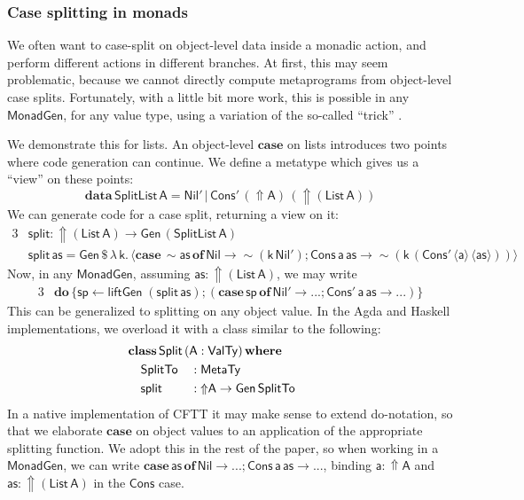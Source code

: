 \documentclass[acmsmall]{acmart}
\newcommand{\mit}[1]{{\mathsf{#1}}}
\newcommand{\msf}[1]{{\mathsf{#1}}}
\newcommand{\mbf}[1]{{\mathbf{#1}}}
\newcommand{\bs}[1]{\boldsymbol{#1}}
\newcommand{\mdo}{\mbf{do}\,}
\newcommand{\ind}{\hspace{1em}}
\newcommand{\lam}{\lambda\,}
\newcommand{\data}{\mbf{data}\,}
\newcommand{\where}{\mbf{where}}
\newcommand{\of}{\mbf{of}\,}
\newcommand{\vas}{\mathsf{as}}
\newcommand{\vk}{\mathsf{k}}
\newcommand{\vA}{\mathsf{A}}
\newcommand{\va}{\mathsf{a}}
\newcommand{\List}{\msf{List}}
\newcommand{\Nil}{\msf{Nil}}
\newcommand{\Cons}{\msf{Cons}}
\newcommand{\fro}{\leftarrow}
\newcommand{\case}{\mbf{case\,}}
\newcommand{\Lift}{{\Uparrow}}
\newcommand{\Up}{{\Uparrow}}
\newcommand{\spl}{{\bs{\sim}}}
\newcommand{\ql}{{\bs{\langle}}}
\newcommand{\qr}{{\bs{\rangle}}}
\newcommand{\MTy}{\msf{MetaTy}}
\newcommand{\VTy}{\msf{ValTy}}
\theoremstyle{remark}
\newcommand{\tyclass}{\mbf{class}}
\newcommand{\Gen}{\msf{Gen}}
\newcommand{\qt}[1]{\ql#1\qr}
\newcommand{\liftGen}{\mit{liftGen}}
\newcommand{\MonadGen}{\msf{MonadGen}}
\newcommand{\dlr}{\,\$\,}
\begin{document}
\subsubsection{Case splitting in monads}
We often want to case-split on object-level data inside a monadic action, and
perform different actions in different branches. At first, this may seem
problematic, because we cannot directly compute metaprograms from object-level
case splits. Fortunately, with a little bit more work, this is possible in any
$\MonadGen$, for any value type, using a variation of the so-called ``trick''
\cite{eta-expansion-trick}.

We demonstrate this for lists. An object-level $\mbf{case}$ on lists introduces
two points where code generation can continue. We define a metatype which gives
us a ``view'' on these points:
\[ \data \msf{SplitList}\,\vA = \Nil'\,|\,\Cons'\,(\Up \vA)\,(\Up (\List\,\vA)) \]
We can generate code for a case split, returning a view on it:
\begin{alignat*}{3}
  &\mit{split} : \Up (\List\,\vA) \to \Gen\,(\msf{SplitList}\,\vA)\\
  &\mit{split}\,\vas = \Gen \dlr \lam \vk.\,\qt{\case \spl \vas\,\of \Nil \to \spl(\vk\,\Nil'); \Cons\,\va\,\vas \to \spl(\vk\,(\Cons'\,\qt{\va}\,\qt{\vas}))}
\end{alignat*}
Now, in any $\MonadGen$, assuming $\vas : \Up(\List\,\vA)$, we may write
\begin{alignat*}{3}
  &\mdo \{\mit{sp} \fro \liftGen\;(\!\mit{split}\,\vas);(\case \mit{sp}\,\of \Nil' \to ...;\Cons'\,\va\,\vas \to ...)\}
\end{alignat*}
This can be generalized to splitting on any object value. In the Agda and
Haskell implementations, we overload it with a class similar to the following:
\begin{alignat*}{3}
  & \hspace{-2em}\mathrlap{\tyclass\,\mit{Split}\,(\vA : \VTy)\,\where}\\
  & \hspace{-2em}\ind \mit{SplitTo} &&: \MTy \\
  & \hspace{-2em}\ind \mit{split}   &&: \Lift \vA \to \Gen\,\mit{SplitTo}
\end{alignat*}
In a native implementation of CFTT it may make sense to extend do-notation, so
that we elaborate $\mbf{case}$ on object values to an application of the
appropriate splitting function. We adopt this in the rest of the paper, so
when working in a $\MonadGen$, we can write $\case \vas\,\of \Nil \to ...;
\Cons\,\va\,\vas \to ...$, binding $\va : \Up \vA$ and $\vas : \Up(\List\,\vA)$
in the $\Cons$ case.
\end{document}
